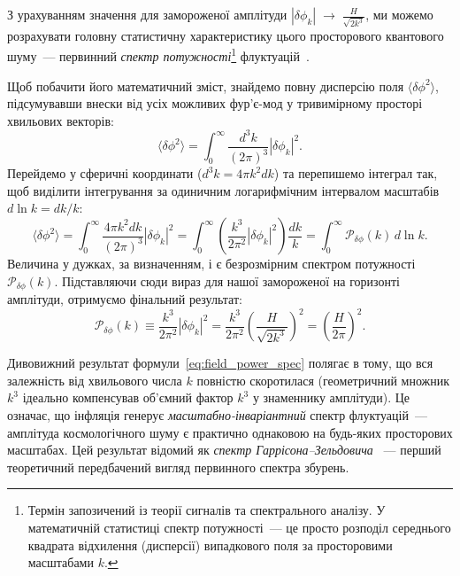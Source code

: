 З урахуванням значення для замороженої
амплітуди $|\delta\phi_k| \;\to\; \frac{H}{\sqrt{2k^3}}$, ми можемо розрахувати головну статистичну характеристику
цього просторового квантового шуму~--- первинний \emph{спектр потужності}\footnote{Термін запозичений із теорії сигналів та спектрального аналізу. У математичній статистиці спектр потужності~--- це просто  розподіл середнього квадрата відхилення (дисперсії) випадкового поля за просторовими масштабами $k$.}
флуктуацій~\cite{mukhanov_chibisov_1981}.

Щоб побачити його математичний зміст, знайдемо повну дисперсію поля $\langle\delta\phi^2\rangle$,
підсумувавши внески від усіх можливих фур'є-мод у тривимірному просторі хвильових векторів:
\begin{equation*}
  \langle\delta\phi^2\rangle = \int_0^\infty \frac{d^3k}{(2\pi)^3} |\delta\phi_k|^2.
\end{equation*}
Перейдемо у сферичні координати ($d^3k = 4\pi k^2 dk$) та перепишемо інтеграл так,
щоб виділити інтегрування за одиничним логарифмічним інтервалом масштабів $d\ln k = dk/k$:
\begin{equation*}
  \langle\delta\phi^2\rangle = \int_0^\infty \frac{4\pi k^2 dk}{(2\pi)^3} |\delta\phi_k|^2
  = \int_0^\infty \left( \frac{k^3}{2\pi^2} |\delta\phi_k|^2 \right) \frac{dk}{k}
  = \int_0^\infty \mathcal{P}_{\delta\phi}(k) \, d\ln k.
\end{equation*}
Величина у дужках, за визначенням, і є безрозмірним спектром потужності $\mathcal{P}_{\delta\phi}(k)$.
Підставляючи сюди вираз для нашої замороженої на горизонті амплітуди, отримуємо фінальний результат:
\begin{equation}\label{eq:field_power_spec}
  \mathcal{P}_{\delta\phi}(k) \equiv \frac{k^3}{2\pi^2}|\delta\phi_k|^2
  = \frac{k^3}{2\pi^2} \left( \frac{H}{\sqrt{2k^3}} \right)^{\!2}
  = \left(\frac{H}{2\pi}\right)^{\!2}.
\end{equation}

Дивовижний результат формули~\eqref{eq:field_power_spec} полягає в тому, що вся
залежність від хвильового числа $k$ повністю скоротилася (геометричний множник $k^3$
ідеально компенсував об'ємний фактор $k^3$ у знаменнику амплітуди). Це означає, що
інфляція генерує \emph{масштабно-інваріантний} спектр флуктуацій~--- амплітуда космологічного шуму є практично однаковою на будь-яких просторових масштабах. Цей результат відомий як \emph{спектр Гар\-рі\-со\-на--Зельдовича} \cite{Harrison1970, Zeldovich1972}~--- перший теоретичний
передбачений вигляд первинного спектра збурень.

